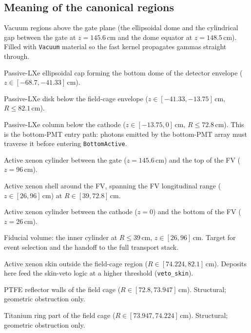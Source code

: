 \documentclass[11pt]{article}
\begin{document}
\subsection{Meaning of the canonical regions}
\label{sec:geometry-regions}

\begin{description}[leftmargin=2.5cm,style=nextline]
\item[\texttt{AirDome}, \texttt{AirCyl}] Vacuum regions above the gate
plane (the ellipsoidal dome and the cylindrical gap between the gate at
$z = 145.6$\,cm and the dome equator at $z = 148.5$\,cm). Filled with
\texttt{Vacuum} material so the fast kernel propagates gammas straight
through.
\item[\texttt{LXe\_dome}] Passive-LXe ellipsoidal cap forming the bottom
dome of the detector envelope ($z \in [-68.7, -41.33]$\,cm).
\item[\texttt{LXe\_below\_FC}] Passive-LXe disk below the field-cage
envelope ($z \in [-41.33, -13.75]$\,cm, $R \leq 82.1$\,cm).
\item[\texttt{LXe\_below\_cathode}] Passive-LXe column below the cathode
($z \in [-13.75, 0]$\,cm, $R \leq 72.8$\,cm). This is the bottom-PMT
entry path: photons emitted by the bottom-PMT array must traverse it before
entering \texttt{BottomActive}.
\item[\texttt{TopActive}] Active xenon cylinder between the gate
($z = 145.6$\,cm) and the top of the FV ($z = 96$\,cm).
\item[\texttt{BarrelActive}] Active xenon shell around the FV, spanning the
FV longitudinal range ($z \in [26, 96]$\,cm) at $R \in [39, 72.8]$\,cm.
\item[\texttt{BottomActive}] Active xenon cylinder between the cathode
($z = 0$) and the bottom of the FV ($z = 26$\,cm).
\item[\texttt{FV}] Fiducial volume: the inner cylinder at $R \leq 39$\,cm,
$z \in [26, 96]$\,cm. Target for event selection and the handoff to the full
transport stack.
\item[\texttt{Skin}] Active xenon skin outside the field-cage region
($R \in [74.224, 82.1]$\,cm). Deposits here feed the skin-veto logic at a
higher threshold (\texttt{veto\_skin}).
\item[\texttt{FC\_PTFE}] PTFE reflector walls of the field cage
($R \in [72.8, 73.947]$\,cm). Structural; geometric obstruction only.
\item[\texttt{FC\_rings}] Titanium ring part of the field cage
($R \in [73.947, 74.224]$\,cm). Structural; geometric obstruction only.
\end{description}
\end{document}
